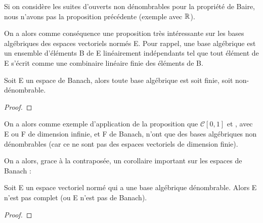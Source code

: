 \begin{remarque}
	Si on considère les suites d'ouverts non dénombrables pour la propriété de
	Baire, nous n'avons pas la proposition précédente (exemple avec $\mathbb{R}$).
\end{remarque}

On a alors comme conséquence une proposition très intéressante sur les bases
algébriques des espaces vectoriels normés E. Pour rappel, une base algébrique
est un ensemble d'éléments B de E linéairement indépendants tel que tout élément
de E s'écrit comme une combinaire linéaire finie des éléments de B.

\begin{proposition}
	Soit E un espace de Banach, alors toute base algébrique est soit finie, soit
	non-dénombrable.
\end{proposition}

\begin{proof}
	
\end{proof}

On a alors comme exemple d'application de la proposition que $\mathcal{C}[0, 1]$
et , avec E ou F de dimension infinie, et F de Banach,
n'ont que des bases algébriques non dénombrables (car ce ne sont pas des espaces
vectoriels de dimension finie).

On a alors, grace à la contraposée, un corollaire important sur les espaces de
Banach :

\begin{corollary}
	Soit E un espace vectoriel normé qui a une base algébrique dénombrable.
	Alors E n'est pas complet (ou E n'est pas de Banach).
\end{corollary}

\begin{proof}
	
\end{proof}
